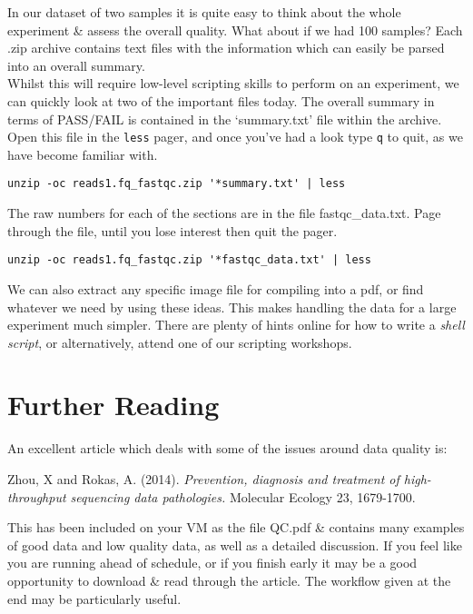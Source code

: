 \begin{advanced}
In our dataset of two samples it is quite easy to think about the whole experiment \& assess the overall quality.
What about if we had 100 samples? 
Each .zip archive contains text files with the information which can easily be parsed into an overall summary. \\

Whilst this will require low-level scripting skills to perform on an experiment, we can quickly look at two of the important files today.
The overall summary in terms of PASS/FAIL is contained in the `summary.txt' file within the archive.
Open this file in the \texttt{less} pager, and once you've had a look type \texttt{q} to quit, as we have become familiar with.
\begin{lstlisting}
unzip -oc reads1.fq_fastqc.zip '*summary.txt' | less
\end{lstlisting}

The raw numbers for each of the sections are in the file fastqc_data.txt.
Page through the file, until you lose interest then quit the pager.
\begin{lstlisting}
unzip -oc reads1.fq_fastqc.zip '*fastqc_data.txt' | less
\end{lstlisting}

We can also extract any specific image file for compiling into a pdf, or find whatever we need by using these ideas.
This makes handling the data for a large experiment much simpler.
There are plenty of hints online for how to write a \textit{shell script}, or alternatively, attend one of our scripting workshops.
\end{advanced}

\section{Further Reading}
An excellent article which deals with some of the issues around data quality is:

Zhou, X and Rokas, A. (2014). \textit{Prevention, diagnosis and treatment of high-throughput sequencing data pathologies.} Molecular Ecology 23, 1679-1700.

This has been included on your VM as the file QC.pdf \& contains many examples of good data and low quality data, as well as a detailed discussion.
If you feel like you are running ahead of schedule, or if you finish early it may be a good opportunity to download \& read through the article.
The workflow given at the end may be particularly useful.